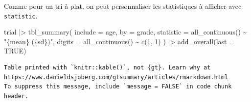 \documentclass[
  letterpaper,
  DIV=11,
  numbers=noendperiod,
  oneside]{scrreprt}
\newenvironment{Shaded}{\begin{snugshade}}{\end{snugshade}}
\newcommand{\AttributeTok}[1]{\textcolor[rgb]{0.40,0.45,0.13}{#1}}
\newcommand{\ConstantTok}[1]{\textcolor[rgb]{0.56,0.35,0.01}{#1}}
\newcommand{\DecValTok}[1]{\textcolor[rgb]{0.68,0.00,0.00}{#1}}
\newcommand{\FunctionTok}[1]{\textcolor[rgb]{0.28,0.35,0.67}{#1}}
\newcommand{\NormalTok}[1]{\textcolor[rgb]{0.00,0.23,0.31}{#1}}
\newcommand{\SpecialCharTok}[1]{\textcolor[rgb]{0.37,0.37,0.37}{#1}}
\newcommand{\StringTok}[1]{\textcolor[rgb]{0.13,0.47,0.30}{#1}}
\begin{document}
Comme pour un tri à plat, on peut personnaliser les statistiques à
afficher avec \texttt{statistic}.

\begin{Shaded}
\begin{Highlighting}[]
\NormalTok{trial }\SpecialCharTok{|\textgreater{}} 
  \FunctionTok{tbl\_summary}\NormalTok{(}
    \AttributeTok{include =}\NormalTok{ age,}
    \AttributeTok{by =}\NormalTok{ grade,}
    \AttributeTok{statistic =} \FunctionTok{all\_continuous}\NormalTok{() }\SpecialCharTok{\textasciitilde{}} \StringTok{"\{mean\} (\{sd\})"}\NormalTok{,}
    \AttributeTok{digits =} \FunctionTok{all\_continuous}\NormalTok{() }\SpecialCharTok{\textasciitilde{}} \FunctionTok{c}\NormalTok{(}\DecValTok{1}\NormalTok{, }\DecValTok{1}\NormalTok{)}
\NormalTok{  ) }\SpecialCharTok{|\textgreater{}} 
  \FunctionTok{add\_overall}\NormalTok{(}\AttributeTok{last =} \ConstantTok{TRUE}\NormalTok{)}
\end{Highlighting}
\end{Shaded}

\begin{verbatim}
Table printed with `knitr::kable()`, not {gt}. Learn why at
https://www.danieldsjoberg.com/gtsummary/articles/rmarkdown.html
To suppress this message, include `message = FALSE` in code chunk header.
\end{verbatim}
\end{document}
